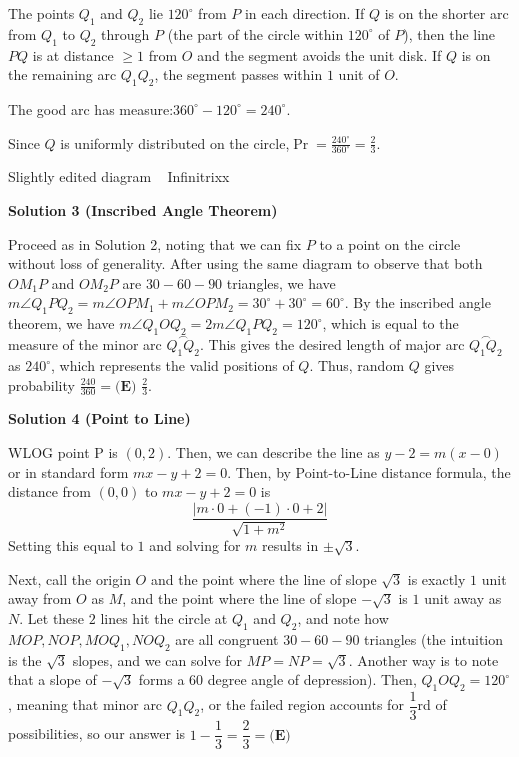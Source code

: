 \begin{enumerate}
 The points $Q_1$ and $Q_2$ lie $120^\circ$ from $P$ in each direction. If $Q$ is on the shorter arc from $Q_1$ to $Q_2$ through $P$ (the part of the circle within $120^\circ$ of $P$), then the line $PQ$ is at distance $\ge 1$ from $O$ and the segment avoids the unit disk. If $Q$ is on the remaining arc $Q_1Q_2$, the segment passes within $1$ unit of $O$.

 The good arc has measure:$360^\circ - 120^\circ = 240^\circ.$

 Since $Q$ is uniformly distributed on the circle,$\Pr = \frac{240^\circ}{360^\circ} = \boxed{\frac{2}{3}}.$

 Slightly edited diagram ~ Infinitrixx

 



\textbf{Solution 3 (Inscribed Angle Theorem)}

Proceed as in Solution 2, noting that we can fix $P$ to a point on the circle without loss of generality. After using the same diagram to observe that both $OM_1P$ and $OM_2P$ are $30-60-90$ triangles, we have $m\angle{Q_1PQ_2} = m\angle{OPM_1} + m\angle{OPM_2} = 30^{\circ} + 30^{\circ} = 60^{\circ}$. By the inscribed angle theorem, we have $m\angle{Q_1OQ_2} = 2m\angle{Q_1PQ_2} = 120^{\circ}$, which is equal to the measure of the minor arc $\overset{\frown}{Q_1Q_2}$. This gives the desired length of major arc $\overset{\frown}{Q_1Q_2}$ as $240^{\circ}$, which represents the valid positions of $Q$. Thus, random $Q$ gives probability $\frac{240}{360} = \boxed{\textbf{(E) } \frac{2}{3}}$.

 



\textbf{Solution 4 (Point to Line)}

WLOG point P is $(0, 2)$. Then, we can describe the line as $y - 2 = m(x - 0)$ or in standard form $mx - y + 2 = 0$. Then, by Point-to-Line distance formula, the distance from $(0, 0)$ to $mx - y + 2 = 0$ is 
 \[\dfrac{\lvert m \cdot 0 + (-1) \cdot 0 + 2 \rvert}{\sqrt{1 + m^2}}\]Setting this equal to $1$ and solving for $m$ results in $\pm \sqrt{3}$.

 Next, call the origin $O$ and the point where the line of slope $\sqrt{3}$ is exactly $1$ unit away from $O$ as $M$, and the point where the line of slope $-\sqrt{3}$ is $1$ unit away as $N$. Let these $2$ lines hit the circle at $Q_1$ and $Q_2$, and note how $MOP, NOP, MOQ_1, NOQ_2$ are all congruent $30-60-90$ triangles (the intuition is the $\sqrt{3}$ slopes, and we can solve for $MP = NP = \sqrt{3}$. Another way is to note that a slope of $-\sqrt{3}$ forms a 60 degree angle of depression). Then, $Q_1OQ_2 = 120^\circ$, meaning that minor arc $Q_1Q_2$, or the failed region accounts for $\dfrac{1}{3}$rd of possibilities, so our answer is $1 - \dfrac{1}{3} = \boxed{\dfrac{2}{3}} = \boxed{\textbf{(E)}}$


\end{enumerate}
